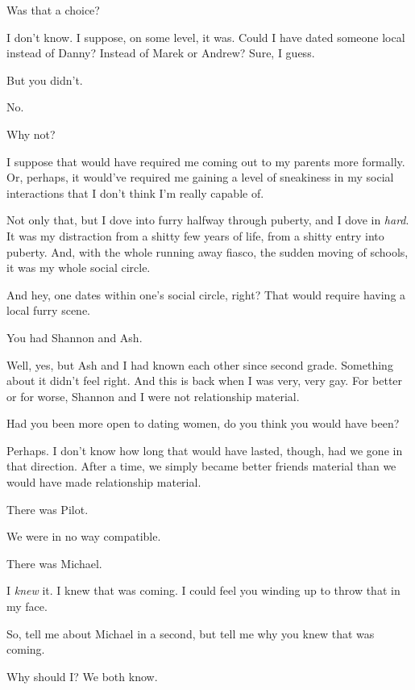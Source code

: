 \begin{leftcolumn}
\begin{ally}
Was that a choice?
\end{ally}
I don't know. I suppose, on some level, it was. Could I have dated someone local instead of Danny? Instead of Marek or Andrew? Sure, I guess.

\begin{ally}
But you didn't.
\end{ally}
No.

\begin{ally}
Why not?
\end{ally}
I suppose that would have required me coming out to my parents more formally. Or, perhaps, it would've required me gaining a level of sneakiness in my social interactions that I don't think I'm really capable of.

Not only that, but I dove into furry halfway through puberty, and I dove in \emph{hard}. It was my distraction from a shitty few years of life, from a shitty entry into puberty. And, with the whole running away fiasco, the sudden moving of schools, it was my whole social circle.

And hey, one dates within one's social circle, right? That would require having a local furry scene.

\begin{ally}
You had Shannon and Ash.
\end{ally}
Well, yes, but Ash and I had known each other since second grade. Something about it didn't feel right. And this is back when I was very, very gay. For better or for worse, Shannon and I were not relationship material.

\begin{ally}
Had you been more open to dating women, do you think you would have been?
\end{ally}
Perhaps. I don't know how long that would have lasted, though, had we gone in that direction. After a time, we simply became better friends material than we would have made relationship material.

\begin{ally}
There was Pilot.
\end{ally}
We were in no way compatible.

\begin{ally}
There was Michael.
\end{ally}
I \emph{knew} it. I knew that was coming. I could feel you winding up to throw that in my face.
\newpage

\begin{ally}
So, tell me about Michael in a second, but tell me why you knew that was coming.
\end{ally}
Why should I? We both know.


\end{leftcolumn}
